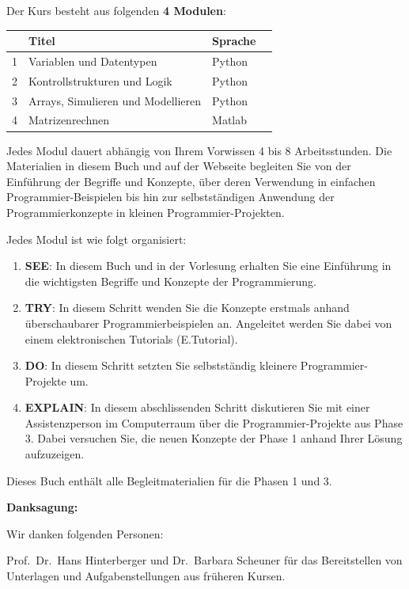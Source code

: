 \documentclass[10pt,paper=17cm:22cm, twoside=true, DIV=14]{scrbook}
\providecommand{\tightlist}{%
  \setlength{\itemsep}{0pt}\setlength{\parskip}{0pt}}
\begin{document}
Der Kurs besteht aus folgenden \textbf{4 Modulen}:

\begin{table}[!htbp]\centering
\begin{tabular}{@{}llll@{}}
\toprule
 & Titel & Sprache \\
\midrule
 1 & Variablen und Datentypen & Python \\
 2 & Kontrollstrukturen und Logik & Python \\
 3 & Arrays, Simulieren und Modellieren & Python \\
 4 & Matrizenrechnen & Matlab \\
\bottomrule
\end{tabular}
\end{table}

Jedes Modul dauert abhängig von Ihrem Vorwissen 4 bis 8 Arbeitsstunden.
Die Materialien in diesem Buch und auf der Webseite begleiten Sie von
der Einführung der Begriffe und Konzepte, über deren Verwendung in
einfachen Programmier-Beispielen bis hin zur selbstständigen Anwendung
der Programmierkonzepte in kleinen Programmier-Projekten.

Jedes Modul ist wie folgt organisiert:

\begin{enumerate}
\def\labelenumi{\arabic{enumi}.}
\tightlist
\item
  \textbf{SEE}: In diesem Buch und in der Vorlesung erhalten Sie eine
  Einführung in die wichtigsten Begriffe und Konzepte der
  Programmierung.
\item
  \textbf{TRY}: In diesem Schritt wenden Sie die Konzepte erstmals
  anhand überschaubarer Programmierbeispielen an. Angeleitet werden Sie
  dabei von einem elektronischen Tutorials (E.Tutorial).
\item
  \textbf{DO}: In diesem Schritt setzten Sie selbstständig kleinere
  Programmier-Projekte um.
\item
  \textbf{EXPLAIN}: In diesem abschlissenden Schritt diskutieren Sie mit
  einer Assistenzperson im Computerraum über die Programmier-Projekte
  aus Phase 3. Dabei versuchen Sie, die neuen Konzepte der Phase 1
  anhand Ihrer Lösung aufzuzeigen.
\end{enumerate}

Dieses Buch enthält alle Begleitmaterialien für die Phasen 1 und 3.

\textbf{Danksagung:}

Wir danken folgenden Personen:

Prof.~Dr.~Hans Hinterberger und Dr.~Barbara Scheuner für das
Bereitstellen von Unterlagen und Aufgabenstellungen aus früheren Kursen.
\end{document}
